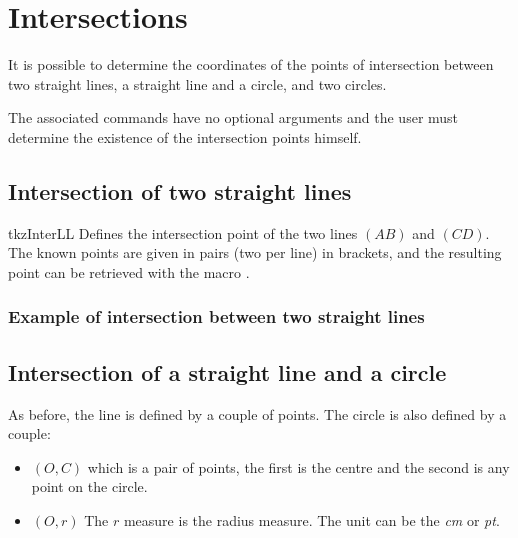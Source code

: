 \section{Intersections}

It is possible to determine the coordinates of the points of intersection
between two straight lines, a straight line and a circle, and two circles.

The associated commands have no optional arguments and the user must determine
the existence of the intersection points himself.

\subsection{Intersection of two straight lines}

\begin{NewMacroBox}{tkzInterLL}{}%
Defines the intersection point  of the two lines $(AB)$
and $(CD)$. The known points are given in pairs (two per line) in brackets, and
the resulting point can be retrieved with the macro .
\end{NewMacroBox}

\subsubsection{Example of intersection between two straight lines}

\begin{tkzexample}[latex=7cm,small]
\end{tkzexample}

\subsection{Intersection of a straight line and a circle}

As before, the line is defined by a couple of points. The circle
is also defined by a couple:

\begin{itemize}
\item $(O,C)$ which is a pair of points, the first is the centre and the second
is any point on the circle.
\item $(O,r)$ The $r$ measure is the radius measure. The unit can be the
\emph{cm} or \emph{pt}.
\end{itemize}

